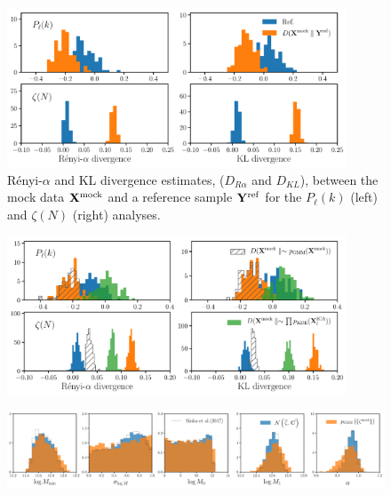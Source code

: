\documentclass[12pt, letterpaper, preprint]{aastex}
\begin{document}
\begin{figure}
\begin{center}
\includegraphics[width=0.9\textwidth]{figs/kNNdiverg_Gauss.pdf}
\caption{R\'enyi-$\alpha$ and KL divergence estimates, ($D_{R\alpha}$ and $D_{KL}$), 
between the mock data ${\bf X}^\mathrm{mock}$ and a reference sample 
${\bf Y}^\mathrm{ref}$ for the $P_\ell(k)$ (left) and $\zeta(N)$ (right) analyses.}
\label{fig:div_gauss}
\end{center}
\end{figure}

\begin{figure}
\begin{center}
\includegraphics[width=0.9\textwidth]{figs/kNNdiverg_nonGauss.pdf}
\caption{}
\label{fig:div_nongauss}
\end{center}
\end{figure}

\begin{figure}
\begin{center}
\includegraphics[width=\textwidth]{figs/Like_GMF_comparison.pdf}
\caption{}
\label{fig:gmf_like}
\end{center}
\end{figure}
\end{document}
